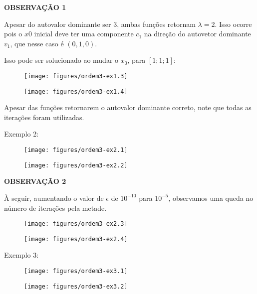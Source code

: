 \documentclass[leqno]{article}
\numberwithin{equation}{section}
\begin{document}
\begin{enumerate}
		\textbf{{\normalsize OBSERVAÇÃO 1}}
	
		Apesar do autovalor dominante ser 3, ambas funções retornam $\lambda = 2$. Isso ocorre pois o $x0$ inicial deve ter uma componente $c_1$ na direção do autovetor dominante $v_1$, que nesse caso é $(0,1,0)$.
		
		Isso pode ser solucionado ao mudar o $x_0$, para $[1;1;1]$:
		
		\begin{figure}[H]
			\centering
			\texttt{[image: figures/ordem3-ex1.3]}
		\end{figure}
		
		\begin{figure}[H]
			\centering
			\texttt{[image: figures/ordem3-ex1.4]}
		\end{figure}
	
		Apesar das funções retornarem o autovalor dominante correto, note que todas as iterações foram utilizadas.
		
		Exemplo 2:
		
		\begin{figure}[H]
			\centering
			\texttt{[image: figures/ordem3-ex2.1]}
		\end{figure}
		
		\begin{figure}[H]
			\centering
			\texttt{[image: figures/ordem3-ex2.2]}
		\end{figure}
	
		\textbf{{\normalsize OBSERVAÇÃO 2}}
		
		À seguir, aumentando o valor de $\epsilon$ de $10^{-10}$ para $10^{-5}$, observamos uma queda no número de iterações pela metade.
		
		\begin{figure}[H]
			\centering
			\texttt{[image: figures/ordem3-ex2.3]}
		\end{figure}
		
		\begin{figure}[H]
			\centering
			\texttt{[image: figures/ordem3-ex2.4]}
		\end{figure}
		
		Exemplo 3:
		
		\begin{figure}[H]
			\centering
			\texttt{[image: figures/ordem3-ex3.1]}
		\end{figure}
		
		\begin{figure}[H]
			\centering
			\texttt{[image: figures/ordem3-ex3.2]}
		\end{figure}
	

\end{enumerate}
\end{document}
